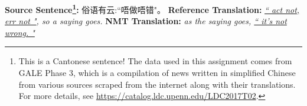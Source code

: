 \begin{parts}
\begin{subparts}
        \subpart[2] 
        \textbf{Source Sentence\footnote{This is a Cantonese sentence! The data used in this assignment comes from GALE Phase 3, which is a compilation of news written in simplified Chinese from various sources scraped from the internet along with their translations. For more details, see \url{https://catalog.ldc.upenn.edu/LDC2017T02}. }:} 俗语有云:``唔做唔错"。\newline
        \textbf{Reference Translation:} \textit{\underline{`` act not, err not "}, so a saying goes.}\newline
        \textbf{NMT Translation:} \textit{as the saying goes, \underline{`` it's not wrong. "}}
        
    \end{subparts}



\end{parts}
